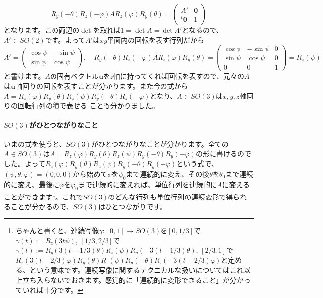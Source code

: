\[
R_y(-\theta) R_z(-\varphi) A R_z(\varphi) R_y(\theta)
=
\begin{pmatrix}
A' & \bm{0} \\
{}^t\bm{0} & 1
\end{pmatrix}
\]
となります。この両辺の$\det$を取れば$1 = \det A = \det A'$となるので、$A' \in SO(2)$です。よって$A'$は$xy$平面内の回転を表す行列だから
\[
A' = 
\begin{pmatrix}
\cos \psi & - \sin \psi \\
\sin \psi & \cos \psi
\end{pmatrix}, \quad
R_y(-\theta) R_z(-\varphi) A R_z(\varphi) R_y(\theta)
=
\begin{pmatrix}
\cos \psi & - \sin \psi & 0 \\
\sin \psi & \cos \psi & 0 \\
0 & 0 & 1
\end{pmatrix}
= R_z(\psi)
\]
と書けます。$A$の固有ベクトル$\bm{u}$を$z$軸に持ってくれば回転を表すので、元々の$A$は$\bm{u}$軸回りの回転を表すことが分かります。また今の式から$A = R_z(\varphi) R_y(\theta) R_z(\psi) R_y(-\theta) R_z(-\varphi)$となり、$A \in SO(3)$は$x, y, z$軸回りの回転行列の積で表せる
ことも分かりました。

\paragraph{$SO(3)$がひとつながりなこと}

いまの式を使うと、$SO(3)$がひとつながりなことが分かります。全ての$A \in SO(3)$は$A = R_z(\varphi) R_y(\theta) R_z(\psi) R_y(-\theta) R_y(-\varphi)$の形に書けるのでした。よって$R_z(\varphi) R_y(\theta) R_z(\psi) R_y(-\theta) R_y(-\varphi)$という式で、$(\psi, \theta, \varphi) = (0, 0, 0)$から始めて$\psi$を$\psi_0$まで連続的に変え、その後$\theta$を$\theta_0$まで連続的に変え、最後に$\varphi$を$\varphi_0$まで連続的に変えれば、単位行列を連続的に$A$に変えることができます\footnote{ちゃんと書くと、連続写像$\gamma \colon [0, 1] \rightarrow SO(3)$を$[0, 1/3]$で$\gamma(t):= R_z(3t\psi)$, $[1/3, 2/3]$で$\gamma(t):= R_y(3(t - 1/3)\theta) R_z(\psi) R_y(-3(t - 1/3)\theta)$, $[2/3, 1]$で$R_z(3(t - 2/3)\varphi) R_y(\theta) R_z(\psi) R_y(-\theta) R_z(-3(t - 2/3)\varphi)$と定める、という意味です。連続写像に関するテクニカルな扱いについてはこれ以上立ち入らないでおきます。感覚的に「連続的に変形できること」が分かっていれば十分です。}。これで$SO(3)$のどんな行列も単位行列の連続変形で得られることが分かるので、$SO(3)$はひとつながりです。

